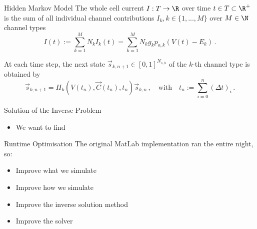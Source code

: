 \documentclass[aspectratio=169, hyperref={colorlinks=true}]{beamer}
\begin{document}
  \begin{frame}{Hidden Markov Model}
    The whole cell current $I: T \to \R$ over time $t \in T \subset \R^+$ is the sum of all individual channel contributions $I_k, k \in \{1, ..., M\}$ over $M \in \N$ channel types
    \begin{equation*}
      I(t) := \sum_{k=1}^{M} N_k I_k(t) = \sum_{k=1}^{M} N_k g_k p_{o,k} \left(V(t)-E_k\right)\,.
      \label{eq:current}
    \end{equation*}

    At each time step, the next state $\vec{s}_{k,n+1} \in [0, 1]^{N_{s,k}}$ of the $k$-th channel type is obtained by
    \begin{equation*}
      \vec{s}_{k,n+1} = H_{k}\left(V(t_n), \vec{C}(t_n), t_n\right) \vec{s}_{k,n}\,,
      \quad\text{with}\quad
      t_n := \sum_{i=0}^n (\Delta t)_i\,.
    \end{equation*}
  \end{frame}

  \begin{frame}{Solution of the Inverse Problem}
    \begin{itemize}
      \item We want to find
    \end{itemize}
  \end{frame}

  \begin{frame}{Runtime Optimisation}
    The original MatLab implementation ran the entire night, so:
    \begin{itemize}
      \item Improve what we simulate
      \item Improve how we simulate
      \item Improve the inverse solution method
      \item Improve the solver
    \end{itemize}
  \end{frame}
\end{document}
